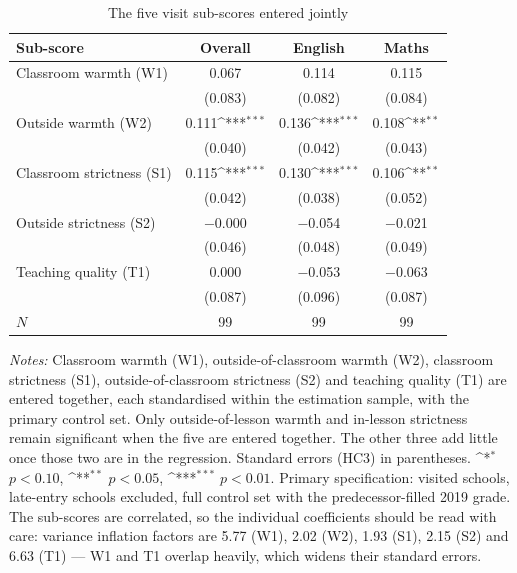 \begin{table}[htbp]\centering
\caption{The five visit sub-scores entered jointly}
\label{tab:subscores}
\def\sym#1{\ifmmode^{#1}\else\(^{#1}\)\fi}
\small

\begin{tabular}{lccc}
\toprule
Sub-score & Overall & English & Maths \\
\midrule
Classroom warmth (W1)        & 0.067 & 0.114 & 0.115 \\
                             & (0.083) & (0.082) & (0.084) \\
\addlinespace
Outside warmth (W2)          & 0.111\sym{***} & 0.136\sym{***} & 0.108\sym{**} \\
                             & (0.040) & (0.042) & (0.043) \\
\addlinespace
Classroom strictness (S1)    & 0.115\sym{***} & 0.130\sym{***} & 0.106\sym{**} \\
                             & (0.042) & (0.038) & (0.052) \\
\addlinespace
Outside strictness (S2)      & $-$0.000 & $-$0.054 & $-$0.021 \\
                             & (0.046) & (0.048) & (0.049) \\
\addlinespace
Teaching quality (T1)        & 0.000 & $-$0.053 & $-$0.063 \\
                             & (0.087) & (0.096) & (0.087) \\
\midrule
$N$                          & 99 & 99 & 99 \\
\bottomrule
\end{tabular}
\begin{minipage}{\linewidth}
\smallskip
\footnotesize\textit{Notes:} Classroom warmth (W1), outside-of-classroom warmth (W2), classroom strictness (S1), outside-of-classroom strictness (S2) and teaching quality (T1) are entered together, each standardised within the estimation sample, with the primary control set. Only outside-of-lesson warmth and in-lesson strictness remain significant when the five are entered together. The other three add little once those two are in the regression. Standard errors (HC3) in parentheses.
\sym{*} \(p<0.10\), \sym{**} \(p<0.05\), \sym{***} \(p<0.01\).
Primary specification: visited schools, late-entry schools excluded, full control set with
the predecessor-filled 2019 grade. The sub-scores are correlated, so the individual
coefficients should be read with care: variance inflation factors are 5.77 (W1),
2.02 (W2), 1.93 (S1), 2.15 (S2) and 6.63 (T1) --- W1 and T1
overlap heavily, which widens their standard errors.
\end{minipage}
\end{table}
